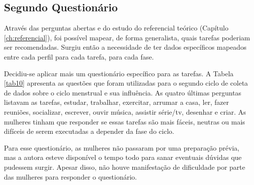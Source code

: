 \subsection{Segundo Questionário}
Através das perguntas abertas e do estudo do referencial teórico (Capítulo \ref{ch:referencial}), 
foi possível mapear, de forma generalista, quais tarefas poderiam ser 
recomendadas. Surgiu então a necessidade de ter dados específicos mapeados entre cada perfil para cada tarefa, 
para cada fase. 

Decidiu-se aplicar mais um questionário específico para as tarefas.
A Tabela \ref{tab10} apresenta as questões que foram utilizadas para o segundo ciclo de coleta 
de dados sobre o ciclo menstrual e 
sua influência. As quatro últimas perguntas listavam as tarefas, estudar, trabalhar, exercitar, arrumar a casa, 
ler, fazer reuniões, socializar, escrever, ouvir música, assistir série/tv, desenhar e criar. As 
mulheres tinham que responder se essas tarefas são mais fáceis, neutras ou mais difíceis de serem executadas 
a depender da fase do ciclo. 

Para esse questionário, as mulheres não passaram por uma preparação prévia, mas a autora esteve disponível o tempo 
todo para sanar eventuais dúvidas que pudessem surgir. Apesar disso, não houve manifestação de dificuldade por parte das mulheres 
para responder o questionário.

